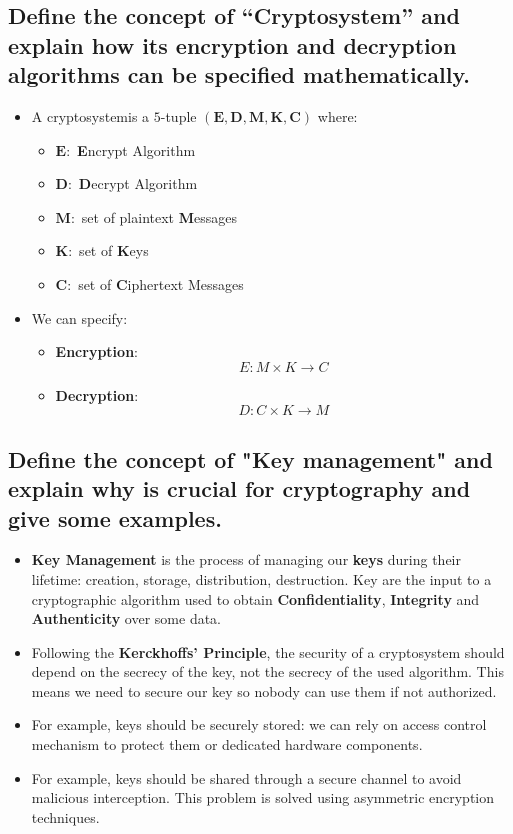 \documentclass[9pt, letterpaper]{article}
\begin{document}
\subsection{Define the concept of “Cryptosystem” and explain how its encryption and decryption algorithms can be specified mathematically.}
\begin{itemize}
	\item A cryptosystemis a $5$-tuple $(\mathbf{E},\mathbf{D},\mathbf{M},\mathbf{K},\mathbf{C})$ where:
	\begin{itemize}
		\item $\mathbf{E}:$ \textbf{E}ncrypt Algorithm
		\item $\mathbf{D}:$ \textbf{D}ecrypt Algorithm
		\item $\mathbf{M}:$ set of plaintext \textbf{M}essages
		\item $\mathbf{K}:$ set of \textbf{K}eys
		\item $\mathbf{C}:$ set of \textbf{C}iphertext Messages
	\end{itemize}
	\item We can specify:
	\begin{itemize}
		\item \textbf{Encryption}: $$E: M \times K \to C$$
		\item \textbf{Decryption}: $$D: C \times K \to M$$
	\end{itemize}
\end{itemize}

\subsection{Define the concept of "Key management" and explain why is crucial for cryptography and give some examples.}
\begin{itemize}
	\item \textbf{Key Management} is the process of managing our \textbf{keys} during their lifetime: creation, storage, distribution, destruction. Key are the input to a cryptographic algorithm used to obtain \textbf{Confidentiality}, \textbf{Integrity} and \textbf{Authenticity} over some data.
	\item Following the \textbf{Kerckhoffs' Principle}, the security of a cryptosystem should depend on the secrecy of the key, not the secrecy of the used algorithm. This means we need to secure our key so nobody can use them if not authorized.
	\item For example, keys should be securely stored: we can rely on access control mechanism to protect them or dedicated hardware components.
	\item For example, keys should be shared through a secure channel to avoid malicious interception. This problem is solved using asymmetric encryption techniques.
\end{itemize}
\end{document}
